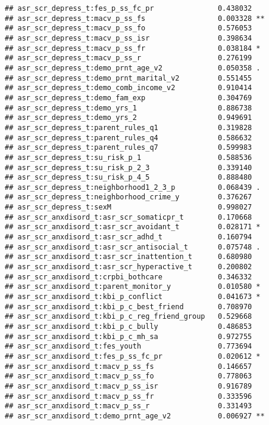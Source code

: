 \documentclass[
]{article}
\begin{document}
\begin{verbatim}
## asr_scr_depress_t:fes_p_ss_fc_pr               0.438032    
## asr_scr_depress_t:macv_p_ss_fs                 0.003328 ** 
## asr_scr_depress_t:macv_p_ss_fo                 0.576053    
## asr_scr_depress_t:macv_p_ss_isr                0.398634    
## asr_scr_depress_t:macv_p_ss_fr                 0.038184 *  
## asr_scr_depress_t:macv_p_ss_r                  0.276199    
## asr_scr_depress_t:demo_prnt_age_v2             0.050358 .  
## asr_scr_depress_t:demo_prnt_marital_v2         0.551455    
## asr_scr_depress_t:demo_comb_income_v2          0.910414    
## asr_scr_depress_t:demo_fam_exp                 0.304769    
## asr_scr_depress_t:demo_yrs_1                   0.886738    
## asr_scr_depress_t:demo_yrs_2                   0.949691    
## asr_scr_depress_t:parent_rules_q1              0.319828    
## asr_scr_depress_t:parent_rules_q4              0.586632    
## asr_scr_depress_t:parent_rules_q7              0.599983    
## asr_scr_depress_t:su_risk_p_1                  0.588536    
## asr_scr_depress_t:su_risk_p_2_3                0.339140    
## asr_scr_depress_t:su_risk_p_4_5                0.888480    
## asr_scr_depress_t:neighborhood1_2_3_p          0.068439 .  
## asr_scr_depress_t:neighborhood_crime_y         0.376267    
## asr_scr_depress_t:sexM                         0.998027    
## asr_scr_anxdisord_t:asr_scr_somaticpr_t        0.170668    
## asr_scr_anxdisord_t:asr_scr_avoidant_t         0.028171 *  
## asr_scr_anxdisord_t:asr_scr_adhd_t             0.160794    
## asr_scr_anxdisord_t:asr_scr_antisocial_t       0.075748 .  
## asr_scr_anxdisord_t:asr_scr_inattention_t      0.680980    
## asr_scr_anxdisord_t:asr_scr_hyperactive_t      0.200802    
## asr_scr_anxdisord_t:crpbi_bothcare             0.346332    
## asr_scr_anxdisord_t:parent_monitor_y           0.010580 *  
## asr_scr_anxdisord_t:kbi_p_conflict             0.041673 *  
## asr_scr_anxdisord_t:kbi_p_c_best_friend        0.708970    
## asr_scr_anxdisord_t:kbi_p_c_reg_friend_group   0.529668    
## asr_scr_anxdisord_t:kbi_p_c_bully              0.486853    
## asr_scr_anxdisord_t:kbi_p_c_mh_sa              0.972755    
## asr_scr_anxdisord_t:fes_youth                  0.773694    
## asr_scr_anxdisord_t:fes_p_ss_fc_pr             0.020612 *  
## asr_scr_anxdisord_t:macv_p_ss_fs               0.146657    
## asr_scr_anxdisord_t:macv_p_ss_fo               0.778063    
## asr_scr_anxdisord_t:macv_p_ss_isr              0.916789    
## asr_scr_anxdisord_t:macv_p_ss_fr               0.333596    
## asr_scr_anxdisord_t:macv_p_ss_r                0.331493    
## asr_scr_anxdisord_t:demo_prnt_age_v2           0.006927 ** 

\end{verbatim}
\end{document}
